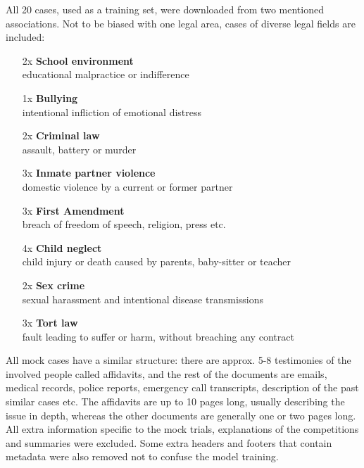 \documentclass[
  digital, %
  notable,   %
  nolof,     %
  nolot,     %
]{fithesis3}
\begin{document}
All 20 cases, used as a training set, were downloaded from two mentioned associations.
Not to be biased with one legal area, cases of diverse legal fields are included:
\begin{itemize}
\itemsep0em
\item[2x] \textbf{School environment} \\ educational malpractice or indifference
\item[1x] \textbf{Bullying} \\ intentional infliction of emotional distress
\item[2x] \textbf{Criminal law} \\ assault, battery or murder
\item[3x] \textbf{Inmate partner violence} \\ domestic violence by a current or former partner
\item[3x] \textbf{First Amendment} \\ breach of freedom of speech, religion, press etc.
\item[4x] \textbf{Child neglect} \\ child injury or death caused by parents, baby-sitter or teacher
\item[2x] \textbf{Sex crime} \\ sexual harassment and intentional disease transmissions
\item[3x] \textbf{Tort law } \\ fault leading to suffer or harm, without breaching any contract
\end{itemize}
All mock cases have a similar structure: there are approx. 5-8 testimonies of the involved people called affidavits, and the rest of the documents are emails, medical records, police reports, emergency call transcripts, description of the past similar cases etc.
The affidavits are up to 10 pages long, usually describing the issue in depth, whereas the other documents are generally one or two pages long.
All extra information specific to the mock trials, explanations of the competitions and summaries were excluded.
Some extra headers and footers that contain metadata were also removed not to confuse the model training.
\end{document}
